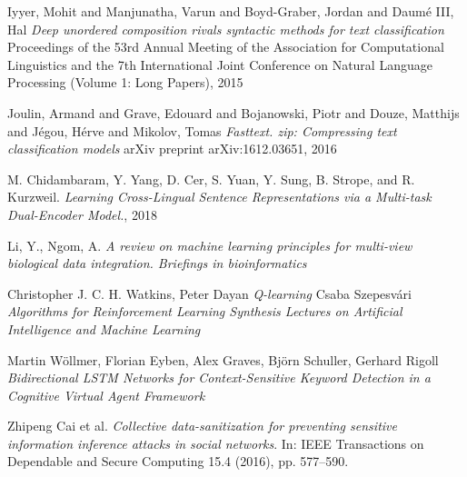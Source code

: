 \begin{thebibliography}{9}
Iyyer, Mohit and Manjunatha, Varun and Boyd-Graber, Jordan and Daum{\'e} III, Hal\newline
\textit{Deep unordered composition rivals syntactic methods for text classification}\newline
Proceedings of the 53rd Annual Meeting of the Association for Computational Linguistics and the 7th International Joint Conference on Natural Language Processing (Volume 1: Long Papers), 2015

Joulin, Armand and Grave, Edouard and Bojanowski, Piotr and Douze, Matthijs and J{\'e}gou, H{\'e}rve and Mikolov, Tomas\newline
\textit{Fasttext. zip: Compressing text classification models}\newline
arXiv preprint arXiv:1612.03651, 2016

M. Chidambaram, Y. Yang, D. Cer, S. Yuan, Y. Sung, B. Strope, and R. Kurzweil. \newline
\textit{Learning Cross-Lingual Sentence Representations via a Multi-task Dual-Encoder Model.}, 2018

Li, Y., Ngom, A.\newline
\textit{A review on machine learning principles for multi-view biological data integration. Briefings in bioinformatics}

Christopher J. C. H. Watkins, Peter Dayan\newline
\textit{Q-learning}
Csaba Szepesvári\newline
\textit{Algorithms for Reinforcement Learning
Synthesis Lectures on Artificial Intelligence and Machine Learning}

Martin Wöllmer, Florian Eyben, Alex Graves, Björn Schuller, Gerhard Rigoll \newline
\textit{Bidirectional LSTM Networks for Context-Sensitive Keyword Detection in a Cognitive Virtual Agent Framework}

Zhipeng Cai et al.\newline
\textit{Collective data-sanitization for preventing sensitive information inference attacks in social networks}.\newline
In: IEEE Transactions on Dependable and Secure Computing 15.4 (2016), pp. 577–590.


\end{thebibliography}
